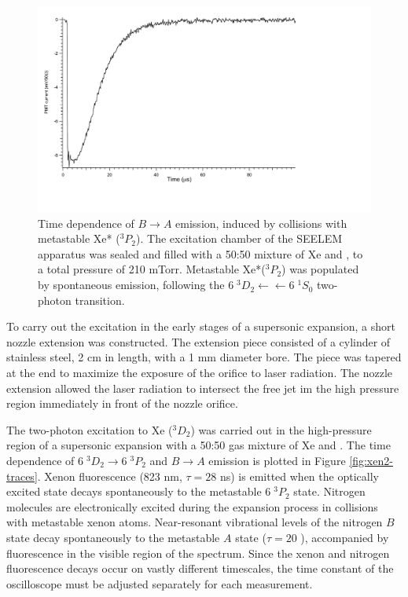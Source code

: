 \documentclass[12pt]{mitthesis}
\begin{document}
\begin{figure}
  \caption{Time dependence of  $B \rightarrow A$ emission,
    induced by collisions with metastable Xe* ($^3P_2$).  The
    excitation chamber of the SEELEM apparatus was sealed and filled
    with a 50:50 mixture of Xe and , to a total pressure of 210
    mTorr.  Metastable Xe*($^3P_2$) was populated by spontaneous
    emission, following the $6\;^3D_2 \leftarrow \leftarrow 6\;^1S_0$
    two-photon transition.}
  \label{fig:xen2-firstlight}
  \vspace{1cm}
  \centering
  \includegraphics[width=7in]{XeN2-firstlight.pdf}
  \vspace{2in}
\end{figure}

To carry out the excitation in the early stages of a supersonic
expansion, a short nozzle extension was constructed.  The extension
piece consisted of a cylinder of stainless steel, 2 cm in length, with
a 1 mm diameter bore.  The piece was tapered at the end to maximize
the exposure of the orifice to laser radiation.  The nozzle extension
allowed the laser radiation to intersect the free jet im the high
pressure region immediately in front of the nozzle orifice.

The two-photon excitation to Xe ($^3D_2$) was carried out in the
high-pressure region of a supersonic expansion with a 50:50 gas
mixture of Xe and .  The time dependence of  $6\;^3D_2
\rightarrow 6\;^3P_2$ and  $B \rightarrow A$ emission is
plotted in Figure \ref{fig:xen2-traces}.  Xenon fluorescence (823 nm,
$\tau=28$ ns) is emitted when the optically excited state decays
spontaneously to the metastable $6\;^3P_2$ state.  Nitrogen molecules
are electronically excited during the expansion process in collisions
with metastable xenon atoms.  Near-resonant vibrational levels of the
nitrogen $B$ state decay spontaneously to the metastable $A$ state
($\tau=20$ \microsec), accompanied by fluorescence in the visible
region of the spectrum.  Since the xenon and nitrogen fluorescence
decays occur on vastly different timescales, the time constant of the
oscilloscope must be adjusted separately for each measurement.
\end{document}
